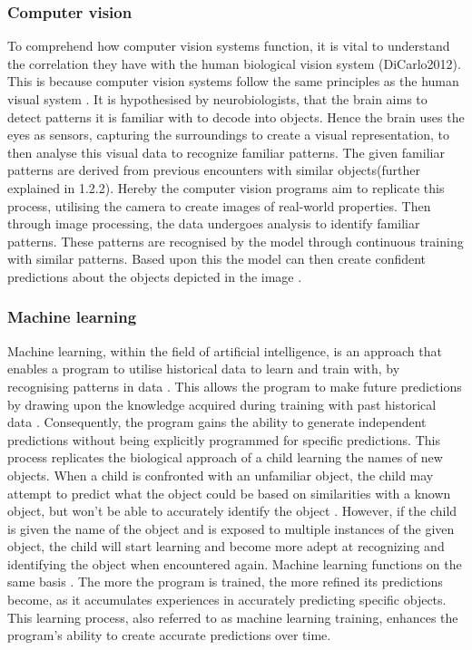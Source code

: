 \subsubsection{Computer vision}
To comprehend how computer vision systems function, it is vital to understand the correlation they have with the human biological vision system (DiCarlo2012). This is because computer vision systems follow the same principles as the human visual system \cite[pp.~1--3]{Voulodimos2018}. It is hypothesised by neurobiologists, that the brain aims to detect patterns it is familiar with to decode into objects. Hence the brain uses the eyes as sensors, capturing the surroundings to create a visual representation, to then analyse this visual data to recognize familiar patterns. The given familiar patterns are derived from previous encounters with similar objects(further explained in 1.2.2). Hereby the computer vision programs aim to replicate this process, utilising the camera to create images of real-world properties. Then through image processing, the data undergoes analysis to identify familiar patterns. These patterns are recognised by the model through continuous training with similar patterns. Based upon this the model can then create confident predictions about the objects depicted in the image \cite[pp.~1--7]{Jahne2000}. 

\subsubsection{Machine learning }
Machine learning, within the field of artificial intelligence, is an approach that enables a program to utilise historical data to learn and train with, by recognising patterns in data  \cite[pp.~2--4]{Zhou2021}. This allows the program to make future predictions by drawing upon the knowledge acquired during training with past historical data \cite[pp.~6--10]{Mitchell1983}. Consequently, the program gains the ability to generate independent predictions without being explicitly programmed for specific predictions. This process replicates the biological approach of a child learning the names of new objects. When a child is confronted with an unfamiliar object, the child may attempt to predict what the object could be based on similarities with a known object, but won't be able to accurately identify the object \cite[pp.~6--10]{Harrington2012}. However,  if the child is given the name of the object and is exposed to multiple instances of the given object, the child will start learning and become more adept at recognizing and identifying the object when encountered again. Machine learning functions on the same basis \cite[p.~16]{Gollapudi2016}. The more the program is trained, the more refined its predictions become, as it accumulates experiences in accurately predicting specific objects. This learning process, also referred to as machine learning training, enhances the program's ability to create accurate predictions over time. 

